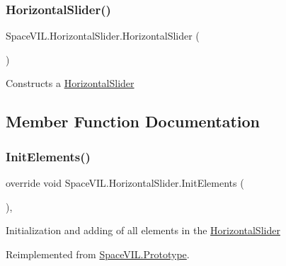 \subsubsection{\texorpdfstring{Horizontal\+Slider()}{HorizontalSlider()}}
{\footnotesize\ttfamily Space\+V\+I\+L.\+Horizontal\+Slider.\+Horizontal\+Slider (\begin{DoxyParamCaption}{ }\end{DoxyParamCaption})\hspace{0.3cm}{\ttfamily [inline]}}



Constructs a \mbox{\hyperlink{class_space_v_i_l_1_1_horizontal_slider}{Horizontal\+Slider}} 



\subsection{Member Function Documentation}
\mbox{\label{class_space_v_i_l_1_1_horizontal_slider_a6b0ab83eeb781a73e8196b744564cd3e}} 
\subsubsection{\texorpdfstring{Init\+Elements()}{InitElements()}}
{\footnotesize\ttfamily override void Space\+V\+I\+L.\+Horizontal\+Slider.\+Init\+Elements (\begin{DoxyParamCaption}{ }\end{DoxyParamCaption})\hspace{0.3cm}{\ttfamily [inline]}, {\ttfamily [virtual]}}



Initialization and adding of all elements in the \mbox{\hyperlink{class_space_v_i_l_1_1_horizontal_slider}{Horizontal\+Slider}} 



Reimplemented from \mbox{\hyperlink{class_space_v_i_l_1_1_prototype_ac3379fe02923ee155b5b0084abf27420}{Space\+V\+I\+L.\+Prototype}}.

\mbox{\label{class_space_v_i_l_1_1_horizontal_slider_a739410ddc3a5391b3ead36097cf2a760}} 
